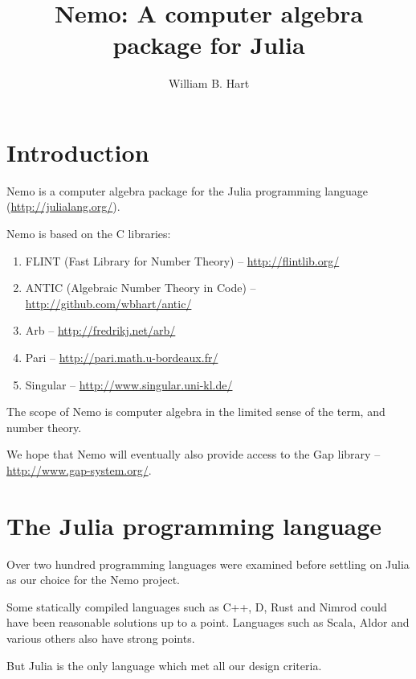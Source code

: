 \documentclass[a4paper,10pt]{article}
\title{Nemo: A computer algebra package for Julia}
\author{William B. Hart}
\begin{document}
\maketitle
\tableofcontents

\section{Introduction}

Nemo is a computer algebra package for the Julia programming language (\url{http://julialang.org/}).

Nemo is based on the C libraries:

\begin{enumerate}
\item FLINT (Fast Library for Number Theory) -- \url{http://flintlib.org/}
\item ANTIC (Algebraic Number Theory in Code) -- \url{http://github.com/wbhart/antic/}
\item Arb -- \url{http://fredrikj.net/arb/}
\item Pari -- \url{http://pari.math.u-bordeaux.fr/}
\item Singular -- \url{http://www.singular.uni-kl.de/}
\end{enumerate}

The scope of Nemo is computer algebra in the limited sense of the term, and number theory. 

We hope that Nemo will eventually also provide access to the Gap library -- 
\url{http://www.gap-system.org/}.

\section{The Julia programming language}

Over two hundred programming languages were examined before settling on Julia as our choice for the
Nemo project.

Some statically compiled languages such as C++, D, Rust and Nimrod could have been reasonable solutions
up to a point. Languages such as Scala, Aldor and various others also have strong points.

But Julia is the only language which met all our design criteria.
\end{document}
